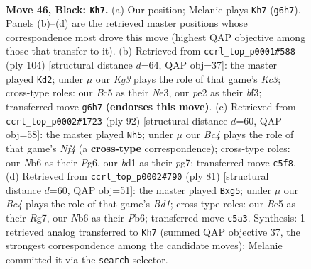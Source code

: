 \documentclass[11pt]{article}
\begin{document}
\clearpage

\begin{figure}[p]\centering
\begin{subfigure}{0.46\textwidth}\centering
\resizebox{\linewidth}{!}{%
\newchessgame
\chessboard[
  setfen={1nb5/1p6/1n4k1/pNbp2p1/7p/PP2P2P/3BP1K1/3B4 b - - 5 46},
  showmover=false,
  pgfstyle=straightmove, color=movearrow, markmove={g6-h7}
]}
\caption{}
\end{subfigure}\hfill
\begin{subfigure}{0.46\textwidth}\centering
\resizebox{\linewidth}{!}{%
\newchessgame
\chessboard[
  setfen={2n5/1p1k4/1p1p2p1/1P3pP1/P1PB1P2/2K1Nb2/8/8 w - - 7 53},
  showmover=false,
  pgfstyle=straightmove, color=movearrow, markmove={c3-d2}
]}
\caption{}
\end{subfigure}
\\[4pt]
\begin{subfigure}{0.46\textwidth}\centering
\resizebox{\linewidth}{!}{%
\newchessgame
\chessboard[
  setfen={8/4k1p1/p1bn1pP1/1p1p1p2/3P1N2/PP1BPK2/8/8 w - - 5 47},
  showmover=false,
  pgfstyle=straightmove, color=movearrow, markmove={f4-h5}
]}
\caption{}
\end{subfigure}\hfill
\begin{subfigure}{0.46\textwidth}\centering
\resizebox{\linewidth}{!}{%
\newchessgame
\chessboard[
  setfen={3bk3/pb4r1/1p1p4/1P1Pp1Pp/4P3/PK4P1/8/1NB4R b - - 4 41},
  showmover=false,
  pgfstyle=straightmove, color=movearrow, markmove={d8-g5}
]}
\caption{}
\end{subfigure}
\caption{\textbf{Move 46, Black: \texttt{Kh7}.} (a) Our position; Melanie plays \texttt{Kh7} (\texttt{g6h7}). Panels (b)--(d) are the retrieved master positions whose correspondence most drove this move (highest QAP objective among those that transfer to it). (b) Retrieved from \texttt{ccrl\_top\_p0001\#588} (ply 104) [structural distance $d$=64, QAP obj=37]: the master played \texttt{Kd2}; under $\mu$ our \emph{Kg3} plays the role of that game's \emph{Kc3}; cross-type roles: our \emph{B}c5 as their \emph{N}e3, our \emph{p}e2 as their \emph{b}f3; transferred move \texttt{g6h7} \textbf{(endorses this move)}. (c) Retrieved from \texttt{ccrl\_top\_p0002\#1723} (ply 92) [structural distance $d$=60, QAP obj=58]: the master played \texttt{Nh5}; under $\mu$ our \emph{Bc4} plays the role of that game's \emph{Nf4} (a \textbf{cross-type} correspondence); cross-type roles: our \emph{N}b6 as their \emph{P}g6, our \emph{b}d1 as their \emph{p}g7; transferred move \texttt{c5f8}. (d) Retrieved from \texttt{ccrl\_top\_p0002\#790} (ply 81) [structural distance $d$=60, QAP obj=51]: the master played \texttt{Bxg5}; under $\mu$ our \emph{Bc4} plays the role of that game's \emph{Bd1}; cross-type roles: our \emph{B}c5 as their \emph{R}g7, our \emph{N}b6 as their \emph{P}b6; transferred move \texttt{c5a3}. Synthesis: 1 retrieved analog transferred to \texttt{Kh7} (summed QAP objective 37, the strongest correspondence among the candidate moves); Melanie committed it via the \texttt{search} selector.}
\label{fig:thought-m91}
\end{figure}
\end{document}

